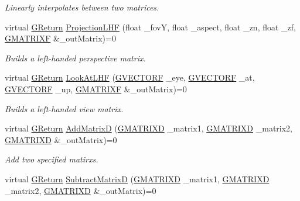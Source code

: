 \begin{DoxyCompactItemize}
\begin{DoxyCompactList}\small\item\em Linearly interpolates between two matrices. \end{DoxyCompactList}\item 
virtual \mbox{\hyperlink{namespaceGW_a67a839e3df7ea8a5c5686613a7a3de21}{G\+Return}} \mbox{\hyperlink{classGW_1_1MATH_1_1GMatrix_a1e46cce75764e9b92a31a84ceb9ffc3b}{Projection\+L\+HF}} (float \+\_\+fovY, float \+\_\+aspect, float \+\_\+zn, float \+\_\+zf, \mbox{\hyperlink{structGW_1_1MATH_1_1GMATRIXF}{G\+M\+A\+T\+R\+I\+XF}} \&\+\_\+out\+Matrix)=0
\begin{DoxyCompactList}\small\item\em Builds a left-\/handed perspective matrix. \end{DoxyCompactList}\item 
virtual \mbox{\hyperlink{namespaceGW_a67a839e3df7ea8a5c5686613a7a3de21}{G\+Return}} \mbox{\hyperlink{classGW_1_1MATH_1_1GMatrix_a33fa9f8f7f8b700f170d1e2654bbfc3b}{Look\+At\+L\+HF}} (\mbox{\hyperlink{structGW_1_1MATH_1_1GVECTORF}{G\+V\+E\+C\+T\+O\+RF}} \+\_\+eye, \mbox{\hyperlink{structGW_1_1MATH_1_1GVECTORF}{G\+V\+E\+C\+T\+O\+RF}} \+\_\+at, \mbox{\hyperlink{structGW_1_1MATH_1_1GVECTORF}{G\+V\+E\+C\+T\+O\+RF}} \+\_\+up, \mbox{\hyperlink{structGW_1_1MATH_1_1GMATRIXF}{G\+M\+A\+T\+R\+I\+XF}} \&\+\_\+out\+Matrix)=0
\begin{DoxyCompactList}\small\item\em Builds a left-\/handed view matrix. \end{DoxyCompactList}\item 
virtual \mbox{\hyperlink{namespaceGW_a67a839e3df7ea8a5c5686613a7a3de21}{G\+Return}} \mbox{\hyperlink{classGW_1_1MATH_1_1GMatrix_a9ae855c7cfbfa08c84bd76a556302bc5}{Add\+MatrixD}} (\mbox{\hyperlink{structGW_1_1MATH_1_1GMATRIXD}{G\+M\+A\+T\+R\+I\+XD}} \+\_\+matrix1, \mbox{\hyperlink{structGW_1_1MATH_1_1GMATRIXD}{G\+M\+A\+T\+R\+I\+XD}} \+\_\+matrix2, \mbox{\hyperlink{structGW_1_1MATH_1_1GMATRIXD}{G\+M\+A\+T\+R\+I\+XD}} \&\+\_\+out\+Matrix)=0
\begin{DoxyCompactList}\small\item\em Add two specified matirxs. \end{DoxyCompactList}\item 
virtual \mbox{\hyperlink{namespaceGW_a67a839e3df7ea8a5c5686613a7a3de21}{G\+Return}} \mbox{\hyperlink{classGW_1_1MATH_1_1GMatrix_a64478828c2d51b739dd116d948cb4ac3}{Subtract\+MatrixD}} (\mbox{\hyperlink{structGW_1_1MATH_1_1GMATRIXD}{G\+M\+A\+T\+R\+I\+XD}} \+\_\+matrix1, \mbox{\hyperlink{structGW_1_1MATH_1_1GMATRIXD}{G\+M\+A\+T\+R\+I\+XD}} \+\_\+matrix2, \mbox{\hyperlink{structGW_1_1MATH_1_1GMATRIXD}{G\+M\+A\+T\+R\+I\+XD}} \&\+\_\+out\+Matrix)=0

\end{DoxyCompactItemize}
